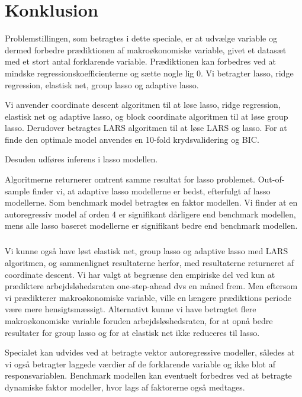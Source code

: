 \chapter{Konklusion}
Problemstillingen, som betragtes i dette speciale, er at udvælge variable og dermed forbedre prædiktionen af makroøkonomiske variable, givet et datasæt med et stort antal forklarende variable.
Prædiktionen kan forbedres ved at mindske regressionskoefficienterne og sætte nogle lig 0.
Vi betragter lasso, ridge regression, elastisk net, group lasso og adaptive lasso.

Vi anvender coordinate descent algoritmen til at løse lasso, ridge regression, elastisk net og adaptive lasso, og block coordinate algoritmen til at løse group lasso.
Derudover betragtes LARS algoritmen til at løse LARS og lasso.
For at finde den optimale model anvendes en 10-fold krydsvalidering og BIC.

Desuden udføres inferens i lasso modellen.


Algoritmerne returnerer omtrent samme resultat for lasso problemet.
Out-of-sample finder vi, at adaptive lasso modellerne er bedst, efterfulgt af lasso modellerne.
Som benchmark model betragtes en faktor modellen.
Vi finder at en autoregressiv model af orden 4 er signifikant dårligere end benchmark modellen, mens alle lasso baseret modellerne er signifikant bedre end benchmark modellen.


\paragraph{}
Vi kunne også have løst elastisk net, group lasso og adaptive lasso med LARS algoritmen, og sammenlignet resultaterne herfor, med resultaterne returneret af coordinate descent.
Vi har valgt at begrænse den empiriske del ved kun at prædiktere arbejdsløhedsraten one-step-ahead dvs en måned frem.
Men eftersom vi prædikterer makroøkonomiske variable, ville en længere prædiktions periode være mere hensigtsmæssigt.
Alternativt kunne vi have betragtet flere makroøkonomiske variable foruden arbejdsløshedsraten, for at opnå bedre resultater for group lasso og for at elastisk net ikke reduceres til lasso.

Specialet kan udvides ved at betragte vektor autoregressive modeller, således at vi også betragter laggede værdier af de forklarende variable og ikke blot af responsvariablen.
%
Benchmark modellen kan eventuelt forbedres ved at betragte dynamiske faktor modeller, hvor lags af faktorerne også medtages.